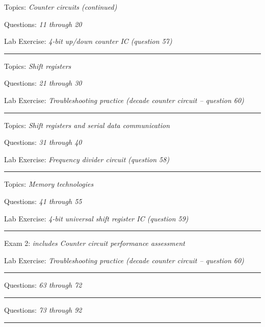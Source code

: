 \hskip 10pt Topics: {\it Counter circuits (continued)}
 
\hskip 10pt Questions: {\it 11 through 20}
 
\hskip 10pt Lab Exercise: {\it 4-bit up/down counter IC (question 57)}
 
\vskip 10pt
\hrule \vskip 5pt
\noindent
{}

\hskip 10pt Topics: {\it Shift registers}
 
\hskip 10pt Questions: {\it 21 through 30}
 
\hskip 10pt Lab Exercise: {\it Troubleshooting practice (decade counter circuit -- question 60)}
 
\vskip 10pt
\hrule \vskip 5pt
\noindent
{}

\hskip 10pt Topics: {\it Shift registers and serial data communication}
 
\hskip 10pt Questions: {\it 31 through 40}
 
\hskip 10pt Lab Exercise: {\it Frequency divider circuit (question 58)}
 
\vskip 10pt
\hrule \vskip 5pt
\noindent
{}

\hskip 10pt Topics: {\it Memory technologies}
 
\hskip 10pt Questions: {\it 41 through 55}
 
\hskip 10pt Lab Exercise: {\it 4-bit universal shift register IC (question 59)}
 

\vskip 10pt
\hrule \vskip 5pt
\noindent
{}

\hskip 10pt Exam 2: {\it includes Counter circuit performance assessment}
 
\hskip 10pt Lab Exercise: {\it Troubleshooting practice (decade counter circuit -- question 60)}
  
\vskip 10pt
\hrule \vskip 5pt
\noindent
{}

\hskip 10pt Questions: {\it 63 through 72}
 
\vskip 10pt
\hrule \vskip 5pt
\noindent
{}

\hskip 10pt Questions: {\it 73 through 92}
 
\vskip 10pt

\hrule \vskip 5pt
\noindent
{}

